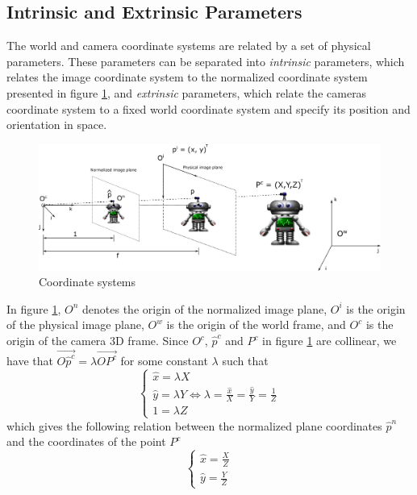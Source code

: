 \subsection{Intrinsic and Extrinsic Parameters}
\label{section:camera_coordinates}
The world and camera coordinate systems are related by a set of physical parameters. These parameters can be separated into \textit{intrinsic} parameters, which relates the image coordinate system to the normalized coordinate system presented in figure \ref{fig:image_coordinates}, and \textit{extrinsic} parameters, which relate the cameras coordinate system to a fixed world coordinate system and specify its position and orientation in space.
\begin{figure}[H]
    \centering
    \includegraphics[width=\linewidth]{intrinsic.png}
    \caption{Coordinate systems}
    \label{fig:image_coordinates}
\end{figure}
In figure \ref{fig:image_coordinates}, $O^n$ denotes the origin of the normalized image plane, $O^i$ is the origin of the physical image plane, $O^w$ is the origin of the world frame, and $O^c$ is the origin of the camera 3D frame. Since $O^c$, $\hat{p}^c$ and $P^c$ in figure \ref{fig:image_coordinates} are collinear, we have that $\overrightarrow{O\hat{p}^c}=\lambda\overrightarrow{OP^c}$ for some constant $\lambda$ such that
\begin{equation}
\begin{cases}
    \hat{x}=\lambda X \\
    \hat{y}=\lambda Y \Longleftrightarrow \lambda = \frac{\hat{x}}{X}=\frac{\hat{y}}{Y}=\frac{1}{Z}\\
    1 = \lambda Z
\end{cases}
\end{equation}
which gives the following relation between the normalized plane coordinates $\hat{p}^n$ and the coordinates of the point $P^c$
\begin{equation}
\label{eq:perspectiveproj}
    \begin{cases}
    \hat{x}=\frac{X}{Z}\\
    \hat{y}=\frac{Y}{Z}
    \end{cases}
\end{equation}
